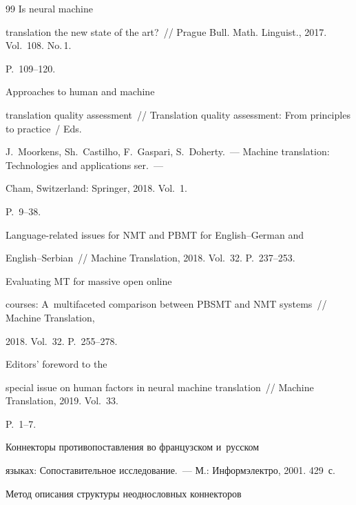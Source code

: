 {{\begin{thebibliography}{99}
 Is neural machine 


translation the new state of the art?~/\!\!/ Prague Bull. Math. Linguist., 2017. Vol.~108. No.\,1.  


P.~109--120.




 Approaches to human and machine 


translation quality assessment~/\!\!/ Translation quality assessment: From principles to practice~/ Eds. 


J.~Moorkens, Sh.~Castilho, F.~Gaspari, S.~Doherty.~--- Machine translation: Technologies and applications ser.~---


Cham, Switzerland: Springer, 2018.  Vol.~1.


P.~9--38.







 Language-related issues for NMT and PBMT for English--German and  


English--Serbian~/\!\!/ Machine Translation, 2018. Vol.~32. P.~237--253.







 Evaluating MT for massive open online 


courses: A~multifaceted comparison between PBSMT and NMT systems~/\!\!/ Machine Translation, 


2018. Vol.~32. P.~255--278.




 Editors' foreword to the 


special issue on human factors in neural machine translation~/\!\!/ Machine Translation, 2019. Vol.~33. 


P.~1--7.




 Коннекторы противопоставления во французском и~русском 


языках: Сопоставительное исследование.~--- М.: Информэлектро, 2001. 429~с.




 Метод описания структуры неоднословных коннекторов 



\end{thebibliography}}}
